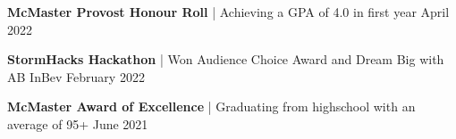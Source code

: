 \textbf{McMaster Provost Honour Roll} | Achieving a GPA of 4.0 in first year	\hfill	April 2022

\textbf{StormHacks Hackathon} | Won Audience Choice Award and Dream Big with AB InBev	\hfill	February 2022


\textbf{McMaster Award of Excellence} | Graduating from highschool with an average of 95+	\hfill	June 2021

